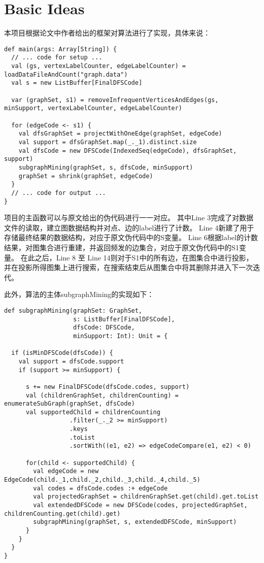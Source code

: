 \documentclass{article}
\begin{document}
\section{Basic Ideas}
本项目根据论文中作者给出的框架对算法进行了实现，具体来说：

\begin{lstlisting}[style=mStyle]
def main(args: Array[String]) {
  // ... code for setup ...
  val (gs, vertexLabelCounter, edgeLabelCounter) = loadDataFileAndCount("graph.data")
  val s = new ListBuffer[FinalDFSCode]

  var (graphSet, s1) = removeInfrequentVerticesAndEdges(gs, minSupport, vertexLabelCounter, edgeLabelCounter)

  for (edgeCode <- s1) {
    val dfsGraphSet = projectWithOneEdge(graphSet, edgeCode)
    val support = dfsGraphSet.map(_._1).distinct.size
    val dfsCode = new DFSCode(IndexedSeq(edgeCode), dfsGraphSet, support)
    subgraphMining(graphSet, s, dfsCode, minSupport)
    graphSet = shrink(graphSet, edgeCode)
  }
  // ... code for output ...
}
\end{lstlisting}

项目的主函数可以与原文给出的伪代码进行一一对应。
其中Line 3完成了对数据文件的读取，建立图数据结构并对点、边的label进行了计数。
Line 4新建了用于存储最终结果的数据结构，对应于原文伪代码中的S变量。
Line 6根据label的计数结果，对图集合进行重建，并返回频发的边集合，对应于原文伪代码中的S1变量。
在此之后，Line 8 至 Line 14则对于S1中的所有边，在图集合中进行投影，并在投影所得图集上进行搜索，在搜索结束后从图集合中将其删除并进入下一次迭代。

此外，算法的主体subgraphMining的实现如下：
\begin{lstlisting}[style=mStyle]
def subgraphMining(graphSet: GraphSet, 
                   s: ListBuffer[FinalDFSCode], 
                   dfsCode: DFSCode, 
                   minSupport: Int): Unit = {

  if (isMinDFSCode(dfsCode)) {
    val support = dfsCode.support
    if (support >= minSupport) {

      s += new FinalDFSCode(dfsCode.codes, support)
      val (childrenGraphSet, childrenCounting) = enumerateSubGraph(graphSet, dfsCode)
      val supportedChild = childrenCounting
                  .filter(_._2 >= minSupport)
                  .keys
                  .toList
                  .sortWith((e1, e2) => edgeCodeCompare(e1, e2) < 0)

      for(child <- supportedChild) {
        val edgeCode = new EdgeCode(child._1,child._2,child._3,child._4,child._5)
        val codes = dfsCode.codes :+ edgeCode
        val projectedGraphSet = childrenGraphSet.get(child).get.toList
        val extendedDFSCode = new DFSCode(codes, projectedGraphSet, childrenCounting.get(child).get)
        subgraphMining(graphSet, s, extendedDFSCode, minSupport)
      }
    }
  }
}
\end{lstlisting}
\end{document}
